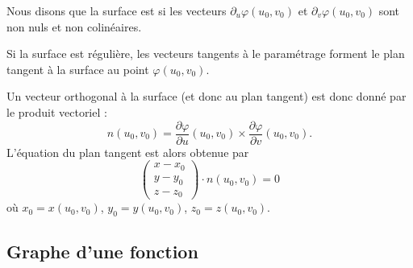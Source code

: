 \begin{definition}      \label{DefSurfReguliere}
	Nous disons que la surface est  si les vecteurs $\partial_u\varphi(u_0,v_0)$ et $\partial_v\varphi(u_0,v_0)$ sont non nuls et non colinéaires.
\end{definition}
Si la surface est régulière, les vecteurs tangents à le paramétrage forment le plan tangent à la surface au point $\varphi(u_0,v_0)$.

Un vecteur orthogonal à la surface (et donc au plan tangent) est donc donné par le produit vectoriel :
\begin{equation}
	n(u_0,v_0)=\frac{ \partial \varphi }{ \partial u }(u_0,v_0)  \times \frac{ \partial \varphi }{ \partial v }(u_0,v_0).
\end{equation}
L'équation du plan tangent est alors obtenue par
\begin{equation}        \label{EqPlanTgSurfaceParm}
	\begin{pmatrix}
		x-x_0 \\
		y-y_0 \\
		z-z_0
	\end{pmatrix}\cdot n(u_0,v_0)=0
\end{equation}
où $x_0=x(u_0,v_0)$, $y_0=y(u_0,v_0)$, $z_0=z(u_0,v_0)$.

\subsection{Graphe d'une fonction}


